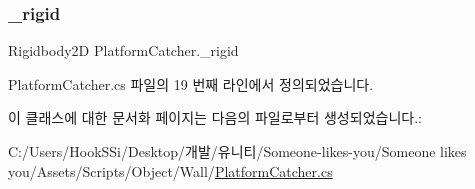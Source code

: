 \subsubsection{\texorpdfstring{\_rigid}{\_rigid}}
{\footnotesize\ttfamily Rigidbody2D Platform\+Catcher.\+\_\+rigid\hspace{0.3cm}{\ttfamily [private]}}



Platform\+Catcher.\+cs 파일의 19 번째 라인에서 정의되었습니다.



이 클래스에 대한 문서화 페이지는 다음의 파일로부터 생성되었습니다.\+:\begin{DoxyCompactItemize}
\item 
C\+:/\+Users/\+Hook\+S\+Si/\+Desktop/개발/유니티/\+Someone-\/likes-\/you/\+Someone likes you/\+Assets/\+Scripts/\+Object/\+Wall/\mbox{\hyperlink{_platform_catcher_8cs}{Platform\+Catcher.\+cs}}\end{DoxyCompactItemize}
